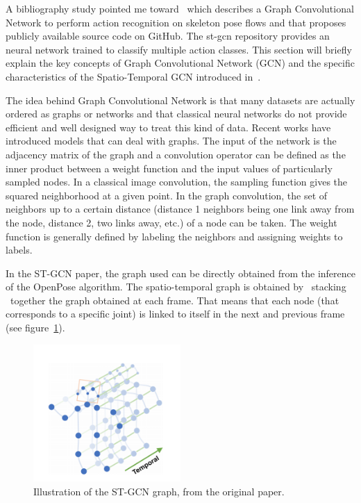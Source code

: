 \documentclass[12pt,a4paper,twoside]{article}
\begin{document}
A bibliography study pointed me toward~\cite{Yan2018} which describes a Graph Convolutional Network to perform action recognition on skeleton pose flows and that proposes publicly available source code on GitHub. The st-gcn repository provides an neural network trained to classify multiple action classes. This section will briefly explain the key concepts of Graph Convolutional Network (GCN) and the specific characteristics of the Spatio-Temporal GCN introduced in~\cite{Yan2018}.

The idea behind Graph Convolutional Network is that many datasets are actually ordered as graphs or networks and that classical neural networks do not provide efficient and well designed way to treat this kind of data. Recent works have introduced models that can deal with graphs. The input of the network is the adjacency matrix of the graph and a convolution operator can be defined as the inner product between a weight function and the input values of particularly sampled nodes. In a classical image convolution, the sampling function gives the squared neighborhood at a given point. In the graph convolution, the set of neighbors up to a certain distance (distance 1 neighbors being one link away from the node, distance 2, two links away, etc.) of a node can be taken. The weight function is generally defined by labeling the neighbors and assigning weights to labels.
 
In the ST-GCN paper, the graph used can be directly obtained from the inference of the OpenPose algorithm. The spatio-temporal graph is obtained by \guillemotleft~stacking \guillemotright~together the graph obtained at each frame. That means that each node (that corresponds to a specific joint) is linked to itself in the next and previous frame (see figure~\ref{fig:stgcn_graph}).

\begin{figure}
    \centering
        \includegraphics[width=0.5\textwidth]{images/stgcn_graph}
    \caption{Illustration of the ST-GCN graph, from the original paper.}
\label{fig:stgcn_graph}
\end{figure}
\end{document}
